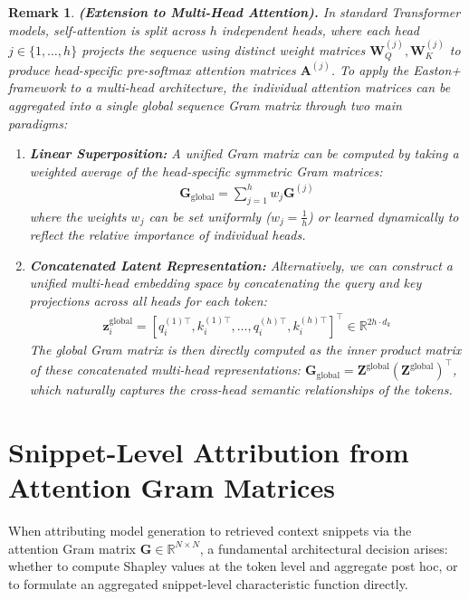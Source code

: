\documentclass{article}
\newtheorem{remark}[theorem]{Remark}
\begin{document}
\begin{remark}
\textbf{(Extension to Multi-Head Attention).}
In standard Transformer models, self-attention is split across $h$ independent heads, where each head $j \in \{1, \dots, h\}$ projects the sequence using distinct weight matrices $\mathbf{W}_Q^{(j)}, \mathbf{W}_K^{(j)}$ to produce head-specific pre-softmax attention matrices $\mathbf{A}^{(j)}$. To apply the Easton+ framework to a multi-head architecture, the individual attention matrices can be aggregated into a single global sequence Gram matrix through two main paradigms:
\begin{enumerate}
    \item \textbf{Linear Superposition:} A unified Gram matrix can be computed by taking a weighted average of the head-specific symmetric Gram matrices:
    \begin{align}
        \mathbf{G}_{\text{global}} = \sum_{j=1}^h w_j \mathbf{G}^{(j)}
    \end{align}
    where the weights $w_j$ can be set uniformly ($w_j = \frac{1}{h}$) or learned dynamically to reflect the relative importance of individual heads.
    \item \textbf{Concatenated Latent Representation:} Alternatively, we can construct a unified multi-head embedding space by concatenating the query and key projections across all heads for each token:
    \begin{align}
        \mathbf{z}_i^{\text{global}} = \left[ q_i^{(1)\top}, k_i^{(1)\top}, \dots, q_i^{(h)\top}, k_i^{(h)\top} \right] ^\top \in \mathbb{R}^{2h \cdot d_k}
    \end{align}
    The global Gram matrix is then directly computed as the inner product matrix of these concatenated multi-head representations: $\mathbf{G}_{\text{global}} = \mathbf{Z}^{\text{global}} (\mathbf{Z}^{\text{global}})^\top$, which naturally captures the cross-head semantic relationships of the tokens.
\end{enumerate}
\end{remark}

\section{Snippet-Level Attribution from Attention Gram Matrices}

When attributing model generation to retrieved context snippets via the attention Gram matrix $\mathbf{G} \in \mathbb{R}^{N \times N}$, a fundamental architectural decision arises: whether to compute Shapley values at the token level and aggregate post hoc, or to formulate an aggregated snippet-level characteristic function directly.
\end{document}
